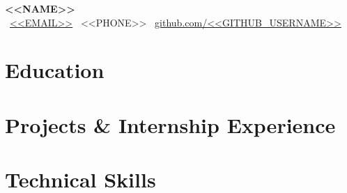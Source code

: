 \documentclass[a4paper,10pt]{article}
\begin{document}
\begin{center}
  {\LARGE \bfseries <<NAME>>} \\[6pt]
  \small \faEnvelope\ \href{mailto:<<EMAIL>>}{<<EMAIL>>} \quad
  \faPhone\ <<PHONE>> \quad
  \faGithub\ \href{https://github.com/<<GITHUB_USERNAME>>}{github.com/<<GITHUB_USERNAME>>}
\end{center}

\section{Education}
\begin{itemize}[label={},leftmargin=0pt]
\end{itemize}

\section{Projects \& Internship Experience}
\begin{itemize}[label={},leftmargin=0pt]
\end{itemize}

\section{Technical Skills}
\begin{itemize}[label={\(\bullet\)},leftmargin=0.15in]
\end{itemize}
\end{document}
